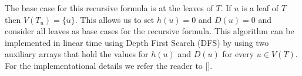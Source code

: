 The base case for this recursive formula is at the leaves of $T$. If $u$ is a leaf of $T$ then $V(T_u) = \{u\}$. This allows us to set $h(u) = 0$ and $D(u) = 0$ and consider all leaves as base cases for the recursive formula. This algorithm can be implemented in linear time using Depth First Search (DFS) by using two auxiliary arrays that hold the values for $h(u)$ and $D(u)$ for every $u \in V(T)$. For the implementational details we refer the reader to [].


%


